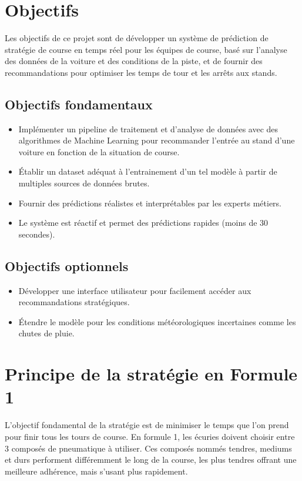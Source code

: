 \section{Objectifs}
Les objectifs de ce projet sont de développer un système de prédiction de stratégie de course en temps réel pour les équipes de course, basé sur l'analyse des données de la voiture et des conditions de la piste, et de fournir des recommandations pour optimiser les temps de tour et les arrêts aux stands.
\subsection{Objectifs fondamentaux}
\begin{itemize}
    \item Implémenter un pipeline de traitement et d’analyse de données avec des algorithmes de Machine Learning pour recommander l’entrée au stand d’une voiture en fonction de la situation de course.
    \item Établir un dataset adéquat à l’entrainement d’un tel modèle à partir de multiples sources de données brutes.
    \item Fournir des prédictions réalistes et interprétables par les experts métiers.
    \item Le système est réactif et permet des prédictions rapides (moins de 30 secondes).
\end{itemize}
\subsection{Objectifs optionnels}
\begin{itemize}
    \item Développer une interface utilisateur pour facilement accéder aux recommandations stratégiques.
    \item Étendre le modèle pour les conditions météorologiques incertaines comme les chutes de pluie.
\end{itemize}

\section{Principe de la stratégie en Formule 1}
L'objectif fondamental de la stratégie est de minimiser le temps que l'on prend pour finir tous les tours de course.
En formule 1, les écuries doivent choisir entre 3 composés de pneumatique à utiliser.
Ces composés nommés tendres, mediums et durs performent différemment le long de la course, les plus tendres offrant une meilleure adhérence, mais s'usant plus rapidement.

